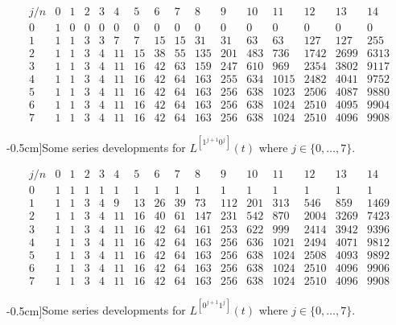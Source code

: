 
\begin{table}
\begin{equation*}\begin{array}{c|ccccccccccccccc}j/n & 0 & 1 & 2 & 3 & 4 & 5 & 6 & 7 & 8 & 9 & 10 & 11 & 12 & 13 & 14\\\hline0 & 1 & 0 & 0 & 0 & 0 & 0 & 0 & 0 & 0 & 0 & 0 & 0 & 0 & 0 & 0\\1 & 1 & 1 & 3 & 3 & 7 & 7 & 15 & 15 & 31 & 31 & 63 & 63 & 127 & 127 & 255\\2 & 1 & 1 & 3 & 4 & 11 & 15 & 38 & 55 & 135 & 201 & 483 & 736 & 1742 & 2699 & 6313\\3 & 1 & 1 & 3 & 4 & 11 & 16 & 42 & 63 & 159 & 247 & 610 & 969 & 2354 & 3802 & 9117\\4 & 1 & 1 & 3 & 4 & 11 & 16 & 42 & 64 & 163 & 255 & 634 & 1015 & 2482 & 4041 & 9752\\5 & 1 & 1 & 3 & 4 & 11 & 16 & 42 & 64 & 163 & 256 & 638 & 1023 & 2506 & 4087 & 9880\\6 & 1 & 1 & 3 & 4 & 11 & 16 & 42 & 64 & 163 & 256 & 638 & 1024 & 2510 & 4095 & 9904\\7 & 1 & 1 & 3 & 4 & 11 & 16 & 42 & 64 & 163 & 256 & 638 & 1024 & 2510 & 4096 & 9908\end{array}\end{equation*}
\caption[][-0.5cm]{Some series developments for $L^{[1^{j+1}0^j]}(t)$ where $j\in \lbrace 0,\ldots,7 \rbrace$.}
\label{tbl:L1_j1:0_j}
\end{table}

\begin{table}
\begin{equation*}\begin{array}{c|ccccccccccccccc}j/n & 0 & 1 & 2 & 3 & 4 & 5 & 6 & 7 & 8 & 9 & 10 & 11 & 12 & 13 & 14\\\hline0 & 1 & 1 & 1 & 1 & 1 & 1 & 1 & 1 & 1 & 1 & 1 & 1 & 1 & 1 & 1\\1 & 1 & 1 & 3 & 4 & 9 & 13 & 26 & 39 & 73 & 112 & 201 & 313 & 546 & 859 & 1469\\2 & 1 & 1 & 3 & 4 & 11 & 16 & 40 & 61 & 147 & 231 & 542 & 870 & 2004 & 3269 & 7423\\3 & 1 & 1 & 3 & 4 & 11 & 16 & 42 & 64 & 161 & 253 & 622 & 999 & 2414 & 3942 & 9396\\4 & 1 & 1 & 3 & 4 & 11 & 16 & 42 & 64 & 163 & 256 & 636 & 1021 & 2494 & 4071 & 9812\\5 & 1 & 1 & 3 & 4 & 11 & 16 & 42 & 64 & 163 & 256 & 638 & 1024 & 2508 & 4093 & 9892\\6 & 1 & 1 & 3 & 4 & 11 & 16 & 42 & 64 & 163 & 256 & 638 & 1024 & 2510 & 4096 & 9906\\7 & 1 & 1 & 3 & 4 & 11 & 16 & 42 & 64 & 163 & 256 & 638 & 1024 & 2510 & 4096 & 9908\end{array}\end{equation*}
\caption[][-0.5cm]{Some series developments for $L^{[0^{j+1}1^j]}(t)$ where $j\in \lbrace 0,\ldots,7 \rbrace$.}
\label{tbl:L0_j1:1_j}
\end{table}

